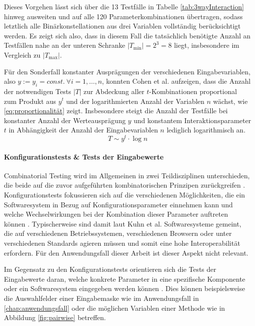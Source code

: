 Dieses Vorgehen lässt sich über die 13 Testfälle in Tabelle \ref{tab:3wayInteraction} hinweg ausweiten und auf alle 120 Parameterkombinationen übertragen, sodass letztlich alle Binärkonstellationen aus drei Variablen vollständig berücksichtigt werden. Es zeigt sich also, dass in diesem Fall die tatsächlich benötigte Anzahl an Testfällen nahe an der unteren Schranke $|T_{\min}| = 2^3 = 8$ liegt, insbesondere im Vergleich zu $|T_{\max}|$.

Für den Sonderfall konstanter Ausprägungen der verschiedenen Eingabevariablen, also $y := y_i = const. ~ \forall i = 1,\dots,n$, konnten Cohen et al. \cite{cohen1997aetg} aufzeigen, dass die Anzahl der notwendigen Tests $|T|$ zur Abdeckung aller $t$-Kombinationen proportional zum Produkt aus $y^t$ und der logarithmierten Anzahl der Variablen $n$ wächst, wie \autoref{eq:proportionalität} zeigt. Insbesondere steigt die Anzahl der Testfälle bei konstanter Anzahl der Werteausprägung $y$ und konstantem Interaktionsparameter $t$ in Abhängigkeit der Anzahl der Eingabevariablen $n$ lediglich logarithmisch an.
\begin{equation}\label{eq:proportionalität}
T \sim y^t \cdot \log n
\end{equation}



\paragraph{Konfigurationstests \& Tests der Eingabewerte}

Combinatorial Testing wird im Allgemeinen in zwei Teildisziplinen unterschieden, die beide auf die zuvor aufgeführten kombinatorischen Prinzipen zurückgreifen \cite{kuhn2010practical}. Konfigurationstests fokussieren sich auf die verschiedenen Möglichkeiten, die ein Softwaresystem in Bezug auf Konfigurationsparameter einnehmen kann und welche Wechselwirkungen bei der Kombination dieser Parameter auftreten können \cite{kuhn2010practical}. Typischerweise sind damit laut Kuhn et al. \cite{kuhn2010practical} Softwaresysteme gemeint, die auf verschiedenen Betriebssystemen, verschiedenen Browsern oder unter verschiedenen Standards agieren müssen und somit eine hohe Interoperabilität erfordern. Für den Anwendungsfall dieser Arbeit ist dieser Aspekt nicht relevant.

Im Gegensatz zu den Konfigurationstests orientieren sich die Tests der Eingabewerte daran, welche konkrete Parameter in eine spezifische Komponente oder ein Softwaresystem eingegeben werden können \cite{kuhn2010practical}. Dies können beispielsweise die Auswahlfelder einer Eingabemaske wie im Anwendungsfall in \autoref{chap:anwendungsfall} oder die möglichen Variablen einer Methode wie in Abbildung \ref{fig:pairwise} betreffen. 

